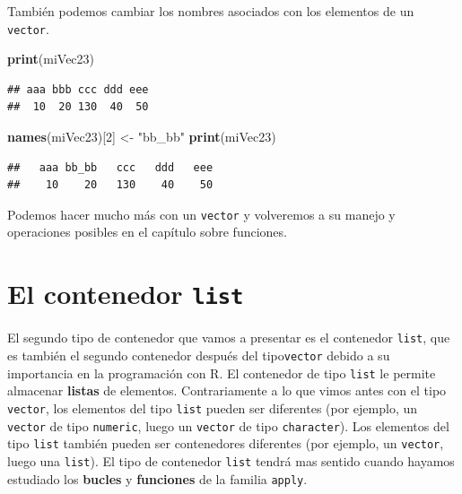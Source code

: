 \documentclass[
]{book}
\newenvironment{Shaded}{\begin{snugshade}}{\end{snugshade}}
\newcommand{\DecValTok}[1]{\textcolor[rgb]{0.00,0.00,0.81}{#1}}
\newcommand{\KeywordTok}[1]{\textcolor[rgb]{0.13,0.29,0.53}{\textbf{#1}}}
\newcommand{\NormalTok}[1]{#1}
\newcommand{\StringTok}[1]{\textcolor[rgb]{0.31,0.60,0.02}{#1}}
\begin{document}
También podemos cambiar los nombres asociados con los elementos de un \texttt{vector}.

\begin{Shaded}
\begin{Highlighting}[]
\KeywordTok{print}\NormalTok{(miVec23)}
\end{Highlighting}
\end{Shaded}

\begin{verbatim}
## aaa bbb ccc ddd eee 
##  10  20 130  40  50
\end{verbatim}

\begin{Shaded}
\begin{Highlighting}[]
\KeywordTok{names}\NormalTok{(miVec23)[}\DecValTok{2}\NormalTok{] <-}\StringTok{ "bb_bb"}
\KeywordTok{print}\NormalTok{(miVec23)}
\end{Highlighting}
\end{Shaded}

\begin{verbatim}
##   aaa bb_bb   ccc   ddd   eee 
##    10    20   130    40    50
\end{verbatim}

Podemos hacer mucho más con un \texttt{vector} y volveremos a su manejo y operaciones posibles en el capítulo sobre funciones.

\hypertarget{l014list}{%
\section{\texorpdfstring{El contenedor \texttt{list}}{El contenedor list}}\label{l014list}}

El segundo tipo de contenedor que vamos a presentar es el contenedor \texttt{list}, que es también el segundo contenedor después del tipo\texttt{vector} debido a su importancia en la programación con R. El contenedor de tipo \texttt{list} le permite almacenar \textbf{listas} de elementos. Contrariamente a lo que vimos antes con el tipo \texttt{vector}, los elementos del tipo \texttt{list} pueden ser diferentes (por ejemplo, un \texttt{vector} de tipo \texttt{numeric}, luego un \texttt{vector} de tipo \texttt{character}). Los elementos del tipo \texttt{list} también pueden ser contenedores diferentes (por ejemplo, un \texttt{vector}, luego una \texttt{list}). El tipo de contenedor \texttt{list} tendrá mas sentido cuando hayamos estudiado los \textbf{bucles} y \textbf{funciones} de la familia \texttt{apply}.
\end{document}
